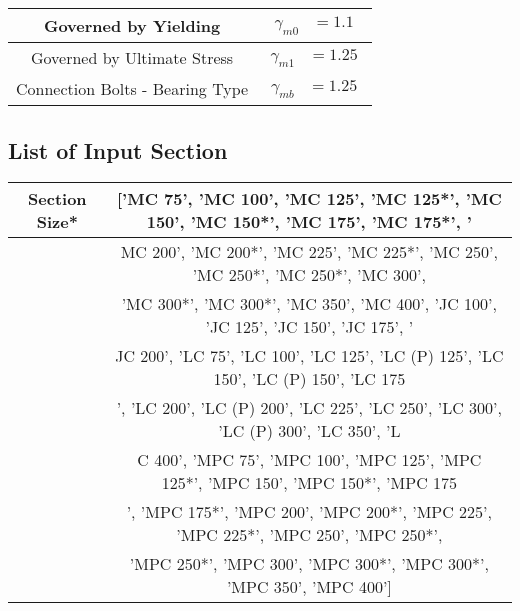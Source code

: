 \documentclass{article}%
\begin{document}
\begin{longtable}{|p{5cm}|p{2cm}|p{2cm}|p{2cm}|p{5cm}|}
\hline%
\hline%
\multicolumn{3}{|c|}{Governed by Yielding}&\multicolumn{2}{|c|}{$\begin{aligned}\gamma_{m0}&=1.1\end{aligned}$}\\%
\hline%
\hline%
\multicolumn{3}{|c|}{Governed by Ultimate Stress}&\multicolumn{2}{|c|}{$\begin{aligned}\gamma_{m1}&=1.25\end{aligned}$}\\%
\hline%
\hline%
\multicolumn{3}{|c|}{Connection Bolts {-} Bearing Type}&\multicolumn{2}{|c|}{$\begin{aligned}\gamma_{mb}&=1.25\end{aligned}$}\\%
\hline%
\end{longtable}%
\subsection{List of Input Section}%
\label{subsec:ListofInputSection}%
\renewcommand{\arraystretch}{1.2}%
\begin{longtable}{|p{8cm}|p{8cm}|}%
\hline%
\multicolumn{1}{|c|}{Section Size*}&\multicolumn{1}{|c|}{{[}'MC 75', 'MC 100', 'MC 125', 'MC 125*', 'MC 150', 'MC 150*', 'MC 175', 'MC 175*', '}\\%
\hline%
\hline%
\multicolumn{1}{|c|}{ }&\multicolumn{1}{|c|}{MC 200', 'MC 200*', 'MC 225', 'MC 225*', 'MC 250', 'MC 250*', 'MC 250*', 'MC 300', }\\%
\hline%
\hline%
\multicolumn{1}{|c|}{ }&\multicolumn{1}{|c|}{'MC 300*', 'MC 300*', 'MC 350', 'MC 400', 'JC 100', 'JC 125', 'JC 150', 'JC 175', '}\\%
\hline%
\hline%
\multicolumn{1}{|c|}{ }&\multicolumn{1}{|c|}{JC 200', 'LC 75', 'LC 100', 'LC 125', 'LC (P) 125', 'LC 150', 'LC (P) 150', 'LC 175}\\%
\hline%
\hline%
\multicolumn{1}{|c|}{ }&\multicolumn{1}{|c|}{', 'LC 200', 'LC (P) 200', 'LC 225', 'LC 250', 'LC 300', 'LC (P) 300', 'LC 350', 'L}\\%
\hline%
\hline%
\multicolumn{1}{|c|}{ }&\multicolumn{1}{|c|}{C 400', 'MPC 75', 'MPC 100', 'MPC 125', 'MPC 125*', 'MPC 150', 'MPC 150*', 'MPC 175}\\%
\hline%
\hline%
\multicolumn{1}{|c|}{ }&\multicolumn{1}{|c|}{', 'MPC 175*', 'MPC 200', 'MPC 200*', 'MPC 225', 'MPC 225*', 'MPC 250', 'MPC 250*',}\\%
\hline%
\hline%
\multicolumn{1}{|c|}{ }&\multicolumn{1}{|c|}{ 'MPC 250*', 'MPC 300', 'MPC 300*', 'MPC 300*', 'MPC 350', 'MPC 400'{]}}\\%
\hline%
\end{longtable}
\end{document}
